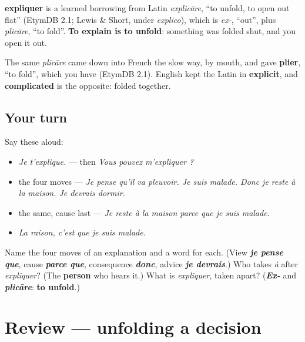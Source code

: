 \begin{cousinweb}
\textbf{expliquer} is a learned borrowing from Latin \emph{explicāre}, \textquotedblleft{}to unfold, to open out flat\textquotedblright{} (EtymDB 2.1; Lewis \& Short, under \emph{explico}), which is \emph{ex-}, \textquotedblleft{}out\textquotedblright{}, plus \emph{plicāre}, \textquotedblleft{}to fold\textquotedblright{}. \textbf{To explain is to unfold}: something was folded shut, and you open it out.

The same \emph{plicāre} came down into French the slow way, by mouth, and gave \textbf{plier}, \textquotedblleft{}to fold\textquotedblright{}, which you have (EtymDB 2.1). English kept the Latin in \textbf{explicit}, and \textbf{complicated} is the opposite: folded together.
\end{cousinweb}

\subsection*{Your turn}
Say these aloud:

\begin{itemize}
\raggedright
  \item \emph{Je t'explique.} — then \emph{Vous pouvez m'expliquer ?}
  \item the four moves — \emph{Je pense qu'il va pleuvoir. Je suis malade. Donc je reste à la maison. Je devrais dormir.}
  \item the same, cause last — \emph{Je reste à la maison parce que je suis malade.}
  \item \emph{La raison, c'est que je suis malade.}
\end{itemize}

\begin{tcolorbox}[breakable,colback=teal!4,colframe=teal!35!black,title={Before you move on}]
Name the four moves of an explanation and a word for each. (View \emph{\textbf{je pense que}}, cause \emph{\textbf{parce que}}, consequence \emph{\textbf{donc}}, advice \emph{\textbf{je devrais}}.) Who takes \emph{à} after \emph{expliquer}? (The \textbf{person} who hears it.) What is \emph{expliquer}, taken apart? (\emph{\textbf{Ex-}} and \emph{\textbf{plicāre}}: \textbf{to unfold}.)
\end{tcolorbox}
\section[(review)]{Review — unfolding a decision}

